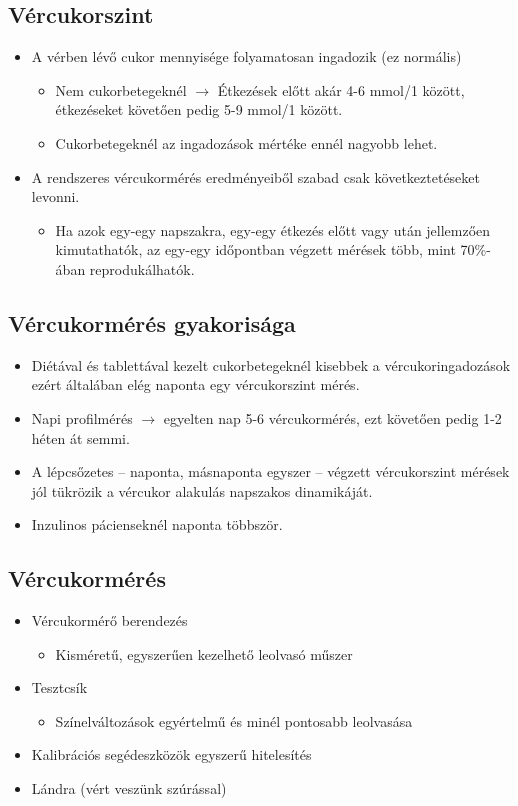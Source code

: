 \subsection{Vércukorszint}
\begin{itemize}
    \item A vérben lévő cukor mennyisége folyamatosan ingadozik (ez normális)
    \begin{itemize}
        \item Nem cukorbetegeknél $\rightarrow$ Étkezések előtt akár 4-6 mmol/1 között, étkezéseket követően pedig 5-9 mmol/1 között.
        \item Cukorbetegeknél az ingadozások mértéke ennél nagyobb lehet.
    \end{itemize}
    \item A rendszeres vércukormérés eredményeiből szabad csak következtetéseket levonni.
    \begin{itemize}
        \item Ha azok egy-egy napszakra, egy-egy étkezés előtt vagy után jellemzően kimutathatók, az egy-egy időpontban végzett mérések több, mint 70\%-ában reprodukálhatók.
    \end{itemize}
\end{itemize}

\subsection{Vércukormérés gyakorisága}
\begin{itemize}
    \item Diétával és tablettával kezelt cukorbetegeknél kisebbek a vércukoringadozások ezért általában elég naponta egy vércukorszint mérés. 
    \item Napi profilmérés $\rightarrow$ egyelten nap 5-6 vércukormérés, ezt követően pedig 1-2 héten át semmi.
    \item A lépcsőzetes – naponta, másnaponta egyszer – végzett vércukorszint mérések jól tükrözik a vércukor alakulás napszakos dinamikáját.
    \item Inzulinos pácienseknél naponta többször.
\end{itemize}

\subsection{Vércukormérés}
\begin{itemize}
    \item Vércukormérő berendezés
    \begin{itemize}
        \item Kisméretű, egyszerűen kezelhető leolvasó műszer
    \end{itemize}
    \item Tesztcsík
    \begin{itemize}
        \item Színelváltozások egyértelmű és minél pontosabb leolvasása
    \end{itemize}
    \item Kalibrációs segédeszközök egyszerű hitelesítés
    \item Lándra (vért veszünk szúrással)
\end{itemize}

